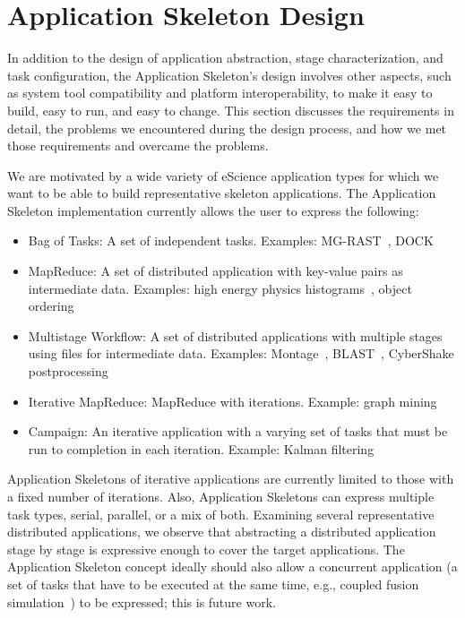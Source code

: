 \documentclass[preprint,12pt]{elsarticle}
\newcommand{\katznote}[1]{ {\textcolor{blue}    { ***Dan:   #1 }}}
\newcommand{\zhaonote}[1]{{\textcolor{cyan}{ ***Zhao:  #1 }}}
\newcommand{\katznote}[1]{}
\newcommand{\zhaonote}[1]{}
\begin{document}
\section{Application Skeleton Design}

\label{lb:Design}
In addition to the design of application abstraction, stage characterization, and task configuration, the Application Skeleton's design involves
other aspects, such as system tool compatibility and platform interoperability, to make it easy to build, easy to run, and easy to change. This section discusses
the requirements in detail, the problems we encountered during the design process, and how we met those requirements and overcame the
problems.

We are motivated by a wide variety of eScience application types for which we want to be able to build representative skeleton applications. The Application Skeleton implementation
currently allows the user to express the following:
\begin{itemize}
\item {Bag of Tasks}: A set of independent tasks. Examples: MG-RAST~\cite{MG-RAST}, DOCK~\cite{dock5-06}
\item {MapReduce}: A set of distributed application with key-value pairs as intermediate data. Examples: high energy physics histograms~\cite{SCIMP}, object ordering~\cite{PageRank2}
\item {Multistage Workflow}: A set of distributed applications with multiple stages using files for intermediate data. Examples: Montage~\cite{montage1}, BLAST~\cite{ParallelBlast}, CyberShake postprocessing~\cite{SCEC07}
\item {Iterative MapReduce}: MapReduce with iterations. Example: %
graph mining~\cite{PREGEL}
\item {Campaign}: An iterative application with a varying set of tasks that must be run to completion in each iteration. Example: Kalman filtering~\cite{KALMAN}
\end{itemize}

Application Skeletons of iterative applications are currently limited to those with a fixed number of iterations. Also, Application Skeletons  can express multiple task types, serial, parallel, or a mix of both. 
Examining several representative distributed applications, we observe
that abstracting a distributed application stage by stage is expressive enough to cover the target applications.
The Application Skeleton concept ideally should also allow a concurrent application (a set of tasks that have to be executed at the same time, e.g., coupled fusion simulation~\cite{klasky:journphy:2005}) to be expressed; this is future work.
\end{document}
